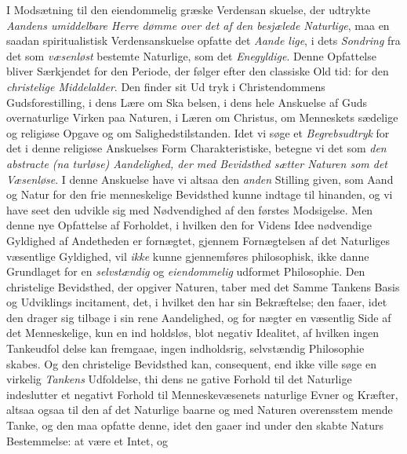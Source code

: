 I Modsætning til den eiendommelig græske Verdensan\-%
skuelse, der udtrykte \emph{Aandens umiddelbare Herre\-%
dømme over det af den besjælede Naturlige}, maa en
saadan spiritualistisk Verdensanskuelse opfatte det \emph{Aande\-%
lige}, i dets \emph{Sondring} fra det som \emph{væsenløst} bestemte
Naturlige, som det \emph{Enegyldige}. Denne Opfattelse bliver
Særkjendet for den Periode, der følger efter den classiske Old\-%
tid: for den \emph{christelige Middelalder}. Den finder sit Ud\-%
tryk i Christendommens Gudsforestilling, i dens Lære om Ska\-%
belsen, i dens hele Anskuelse af Guds overnaturlige Virken
paa Naturen, i Læren om Christus, om Menneskets sædelige
 og religiøse Opgave og om Salighedstilstanden. Idet vi søge
et \emph{Begrebsudtryk} for det i denne religiøse Anskuelses Form
Charakteristiske, betegne vi det som \emph{den abstracte (na\-%
turløse) Aandelighed, der med Bevidsthed sætter
Naturen som det Væsenløse}. I denne Anskuelse have vi
altsaa den \emph{anden} Stilling given, som Aand og Natur for den
frie menneskelige Bevidsthed kunne indtage til hinanden, og
vi have seet den udvikle sig med Nødvendighed af den førstes
Modsigelse. Men denne nye Opfattelse af Forholdet, i hvilken
den for Videns Idee nødvendige Gyldighed af Andetheden er
fornægtet, gjennem Fornægtelsen af det Naturliges væsentlige
Gyldighed, vil \emph{ikke} kunne gjennemføres philosophisk, ikke
danne Grundlaget for en \emph{selvstændig} og \emph{eiendommelig}
udformet Philosophie. Den christelige Bevidsthed, der opgiver
Naturen, taber med det Samme Tankens Basis og Udviklings\-%
incitament, det, i hvilket den har sin Bekræftelse; den faaer,
idet den drager sig tilbage i sin rene Aandelighed, og for\-%
nægter en væsentlig Side af det Menneskelige, kun en ind\-%
holdsløs, blot negativ Idealitet, af hvilken ingen Tankeudfol\-%
delse kan fremgaae, ingen indholdsrig, selvstændig Philosophie
skabes. Og den christelige Bevidsthed kan, consequent, end
ikke ville søge en virkelig \emph{Tankens} Udfoldelse, thi dens ne\-%
gative Forhold til det Naturlige indeslutter et negativt Forhold
til Menneskevæsenets naturlige Evner og Kræfter, altsaa ogsaa
til den af det Naturlige baarne og med Naturen overensstem\-%
mende Tanke, og den maa opfatte denne, idet den gaaer ind
under den skabte Naturs Bestemmelse: at være et Intet, og
